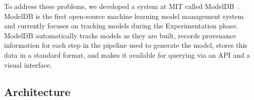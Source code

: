 \documentclass[11pt]{article}
\newcommand{\mdb}{{\sc ModelDB}\xspace}
\newcommand{\mlwf}{ML workflow\xspace}
\begin{document}





To address these problems, we developed a system at MIT called \mdb~\cite{modeldb-hilda}. 
\mdb is the first open-source machine learning model management system and currently focuses on tracking models during the Experimentation phase.
\mdb automatically tracks models as they are built, records 
provenance information for each step in the pipeline used to generate the model, stores this 
data in a standard format, and makes it available for querying via an API and a visual interface.



\subsection{Architecture}
\end{document}
